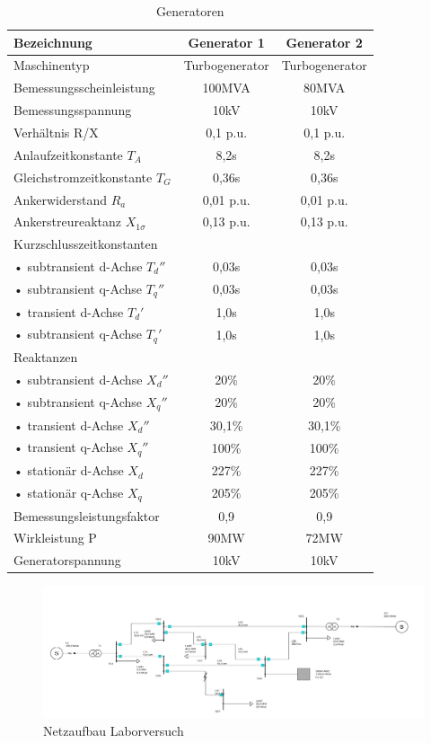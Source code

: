 \begin{table}[H]

\begin{tabular}{|l|c|c|}
\hline 
\textbf{Bezeichnung} & \textbf{Generator 1} & \textbf{Generator 2} \\ 
\hline 
Maschinentyp & Turbogenerator & Turbogenerator \\ 
\hline 
Bemessungsscheinleistung & 100MVA & 80MVA \\ 
\hline 
Bemessungsspannung & 10kV & 10kV \\ 
\hline 
Verhältnis R/X & 0,1 p.u. & 0,1 p.u. \\ 
\hline 
Anlaufzeitkonstante $T_A$ & 8,2s & 8,2s \\
\hline
Gleichstromzeitkonstante $T_G$ & 0,36s & 0,36s \\
\hline
Ankerwiderstand $R_a$ & 0,01 p.u. & 0,01 p.u. \\
\hline
Ankerstreureaktanz $X_{1\sigma}$ & 0,13 p.u. & 0,13 p.u. \\
\hline
\multicolumn{3}{|l|}{Kurzschlusszeitkonstanten} \\
\hline
• subtransient d-Achse $T_d''$ & 0,03s & 0,03s \\
\hline
• subtransient q-Achse $T_q''$ & 0,03s & 0,03s \\
\hline
• transient d-Achse $T_d'$ & 1,0s & 1,0s \\
\hline
• subtransient q-Achse $T_q'$ & 1,0s & 1,0s \\
\hline
\multicolumn{3}{|l|}{Reaktanzen} \\
\hline
• subtransient d-Achse $X_{d}''$ & 20\% & 20\% \\ 
\hline
• subtransient q-Achse $X_q''$ & 20\% & 20\% \\
\hline
• transient d-Achse $X_{d}''$ & 30,1\% & 30,1\% \\ 
\hline
• transient q-Achse $X_q''$ & 100\% & 100\% \\
\hline
• stationär d-Achse $X_d$ & 227\% & 227\% \\
\hline
• stationär q-Achse $X_q$ & 205\% & 205\% \\
\hline
Bemessungsleistungsfaktor & 0,9 & 0,9 \\ 
\hline 
Wirkleistung P & 90MW & 72MW \\ 
\hline 
Generatorspannung & 10kV & 10kV \\ 
\hline
\end{tabular}

\caption{Generatoren}
\end{table}


	\begin{figure}[H]
	\centering
	\includegraphics[scale=0.35, angle=90]{img/praktikum-netz}
	\caption{Netzaufbau Laborversuch}
	\label{praktikum-netz}
	\end{figure}